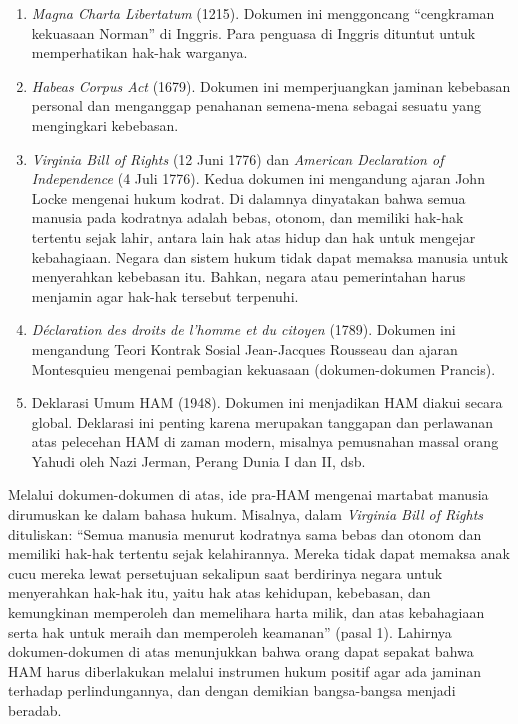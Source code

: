 \documentclass[11pt,twoside,a5paper,openany]{memoir}
\def\tightlist{}
\begin{document}
\begin{enumerate}
\def\labelenumi{\arabic{enumi}.}
\tightlist
\item
  \emph{Magna Charta Libertatum} (1215). Dokumen ini menggoncang
  ``cengkraman kekuasaan Norman'' di Inggris. Para penguasa di Inggris
  dituntut untuk memperhatikan hak-hak warganya.
\item
  \emph{Habeas Corpus Act} (1679). Dokumen ini memperjuangkan jaminan
  kebebasan personal dan menganggap penahanan semena-mena sebagai
  sesuatu yang mengingkari kebebasan.
\item
  \emph{Virginia Bill of Rights} (12 Juni 1776) dan \emph{American
  Declaration of Independence} (4 Juli 1776). Kedua dokumen ini
  mengandung ajaran John Locke mengenai hukum kodrat. Di dalamnya
  dinyatakan bahwa semua manusia pada kodratnya adalah bebas, otonom,
  dan memiliki hak-hak tertentu sejak lahir, antara lain hak atas hidup
  dan hak untuk mengejar kebahagiaan. Negara dan sistem hukum tidak
  dapat memaksa manusia untuk menyerahkan kebebasan itu. Bahkan, negara
  atau pemerintahan harus menjamin agar hak-hak tersebut terpenuhi.
\item
  \emph{Déclaration des droits de l'homme et du citoyen} (1789). Dokumen
  ini mengandung Teori Kontrak Sosial Jean-Jacques Rousseau dan ajaran
  Montesquieu mengenai pembagian kekuasaan (dokumen-dokumen Prancis).
\item
  Deklarasi Umum HAM (1948). Dokumen ini menjadikan HAM diakui secara
  global. Deklarasi ini penting karena merupakan tanggapan dan
  perlawanan atas pelecehan HAM di zaman modern, misalnya pemusnahan
  massal orang Yahudi oleh Nazi Jerman, Perang Dunia I dan II, dsb.
\end{enumerate}

Melalui dokumen-dokumen di atas, ide pra-HAM mengenai martabat manusia
dirumuskan ke dalam bahasa hukum. Misalnya, dalam \emph{Virginia Bill of
Rights} dituliskan: ``Semua manusia menurut kodratnya sama bebas dan
otonom dan memiliki hak-hak tertentu sejak kelahirannya. Mereka tidak
dapat memaksa anak cucu mereka lewat persetujuan sekalipun saat
berdirinya negara untuk menyerahkan hak-hak itu, yaitu hak atas
kehidupan, kebebasan, dan kemungkinan memperoleh dan memelihara harta
milik, dan atas kebahagiaan serta hak untuk meraih dan memperoleh
keamanan'' (pasal 1). Lahirnya dokumen-dokumen di atas menunjukkan bahwa
orang dapat sepakat bahwa HAM harus diberlakukan melalui instrumen hukum
positif agar ada jaminan terhadap perlindungannya, dan dengan demikian
bangsa-bangsa menjadi beradab.
\end{document}
